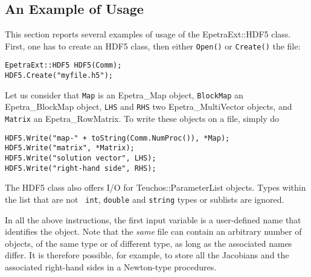 \documentclass[11pt,relax]{SANDreport}
\begin{document}
\subsection{An Example of Usage}
\label{sec:hdf5:example}

This section reports several examples of usage of the EpetraExt::HDF5 class. 
First, one has to create an HDF5 class, then either {\tt Open()} or 
{\tt Create()} the file:
\begin{verbatim}
EpetraExt::HDF5 HDF5(Comm);
HDF5.Create("myfile.h5");
\end{verbatim}
Let us consider that {\tt Map} is an Epetra\_Map object, {\tt BlockMap} an
Epetra\_BlockMap object, {\tt LHS} and {\tt RHS} two Epetra\_MultiVector
objects, and {\tt Matrix} an Epetra\_RowMatrix. To write these objects on a
file, simply do
\begin{verbatim}
HDF5.Write("map-" + toString(Comm.NumProc()), *Map);
HDF5.Write("matrix", *Matrix);
HDF5.Write("solution vector", LHS);
HDF5.Write("right-hand side", RHS);
\end{verbatim}
The HDF5 class also offers I/O for Teuchos::ParameterList objects. Types
within the list that are not {\tt
  int}, {\tt double} and {\tt string} types or sublists are ignored.

In all the above instructions, the first input variable is a user-defined name
that identifies the object. Note that the {\sl same} file can contain an
arbitrary number of objects, of the same type or of different type, as long as
the associated names differ. It is therefore possible, for example, to store
all the Jacobians and the associated right-hand sides in a Newton-type
procedures.
\end{document}
